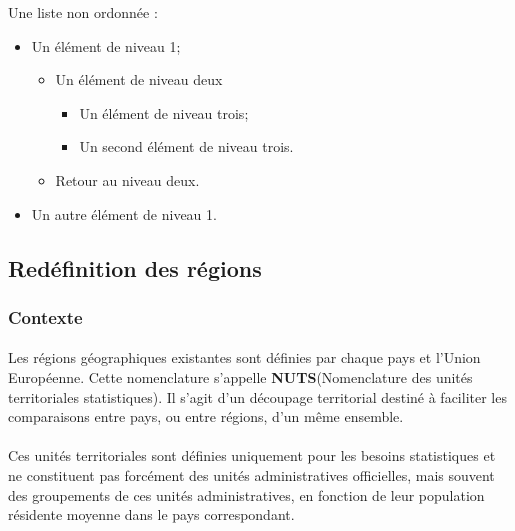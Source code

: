 Une liste non ordonnée :
\begin{itemize}
    \item Un élément de niveau 1;
    \begin{itemize}
        \item Un élément de niveau deux
        \begin{itemize}
            \item Un élément de niveau trois;
            \item Un second élément de niveau trois.
        \end{itemize}
        \item Retour au niveau deux.
    \end{itemize}
    \item Un autre élément de niveau 1.
\end{itemize}

\subsection{Redéfinition des régions}
\subsubsection{Contexte}
\paragraph{}
\vspace{-2em}
Les régions géographiques existantes sont définies par chaque pays et l'Union Européenne. 
Cette nomenclature s'appelle \textbf{NUTS}(Nomenclature des unités territoriales statistiques). Il s'agit d'un découpage territorial destiné à faciliter les comparaisons entre pays, ou entre régions, d'un même ensemble.
\paragraph{}
\vspace{-2em}
Ces unités territoriales sont définies uniquement pour les besoins statistiques et ne constituent pas forcément des unités administratives officielles, mais souvent des groupements de ces unités administratives, en fonction de leur population résidente moyenne dans le pays correspondant.
